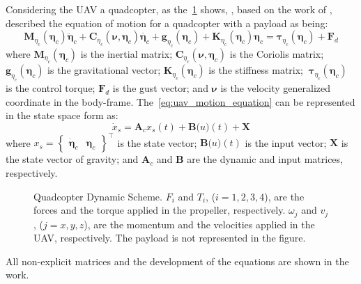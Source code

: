 Considering the UAV a quadcopter, as the~\cref{fig:quadcopter_forces_scheme} shows, \textcite{geronel2023}, based on the work of \textcite{fossen1994}, described the equation of motion for a quadcopter with a payload as being:
%
\begin{equation}
    \mathbf{M}_{\eta_{c}}(\mathbf{\eta}_c)\ddot{\mathbf{\eta}}_c +
    \mathbf{C}_{\eta_c}(\mathbf{\nu},\mathbf{\eta}_c)\dot{\mathbf{\eta}_c} +
    \mathbf{g}_{\eta_c}(\mathbf{\eta}_c) +
    \mathbf{K}_{\eta_c}(\mathbf{\eta}_c)\mathbf{\eta}_c =
    \mathbf{\tau}_{\eta_c}(\mathbf{\eta}_c) + 
    \mathbf{F}_d
    \label{eq:uav_motion_equation}
\end{equation}
%
where \(\mathbf{M}_{\eta_{c}}(\mathbf{\eta}_c)\) is the inertial matrix; \(\mathbf{C}_{\eta_c}(\mathbf{\nu},\mathbf{\eta}_c)\) is the Coriolis matrix; \(\mathbf{g}_{\eta_c}(\mathbf{\eta}_c)\) is the gravitational vector; \(\mathbf{K}_{\eta_c}(\mathbf{\eta}_c)\) is the stiffness matrix; \(\ \mathbf{\tau}_{\eta_c}(\mathbf{\eta}_c)\) is the control torque; \(\mathbf{F}_d\) is the gust vector; and \(\mathbf{\nu}\) is the velocity generalized coordinate in the body-frame. 
The~\cref{eq:uav_motion_equation} can be represented in the state space form as:
%
\begin{equation}
    \dot{x}_s = \mathbf{A}_c x_s(t) + \mathbf{B}\mathbf(u)(t) + \mathbf{X}
\end{equation}
%
where \(x_s = \begin{Bmatrix} \dot{\mathbf{\eta}}_c & \mathbf{\eta}_c \end{Bmatrix}^{\top}\) is the state vector; \(\mathbf{B}\mathbf(u)(t)\) is the input vector; \(\mathbf{X}\) is the state vector of gravity; and \(\mathbf{A}_c\) and \(\mathbf{B}\) are the dynamic and input matrices, respectively.
%
\begin{figure}[!htb]
    \centering
    \caption[Quadcopter Dynamic Scheme]{Quadcopter Dynamic Scheme. \(F_i\) and \(T_i\), (\(i=1,2,3,4\)), are the forces and the torque applied in the propeller, respectively. \(\omega_j\) and \(v_j\), (\(j=x,y,z\)), are the momentum and the velocities applied in the UAV, respectively. The payload is not represented in the figure.}
    
    
    \label{fig:quadcopter_forces_scheme}
\end{figure}

All non-explicit matrices and the development of the equations are shown in the \textcite{geronel2023} work.

